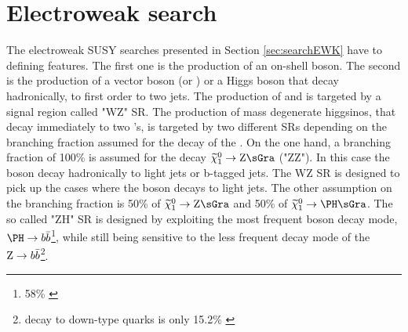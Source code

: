 \section{Electroweak search}
The electroweak SUSY searches presented in Section \ref{sec:searchEWK} have to defining features. The first one is the production of an on-shell \PZ boson. 
The second is the production of a vector boson (\PW or \PZ) or a Higgs boson that decay hadronically, to first order to two jets. 
The production of \firstcharg and \PSGczDt is targeted by a signal region called "WZ" SR. 
The production of mass degenerate higgsinos, that decay immediately to two \PSGczDo's, is targeted by two different SRs depending on the branching fraction assumed for the decay of the \PSGczDo. 
On the one hand, a branching fraction of 100\% is assumed for the decay $\PSGczDo\rightarrow\PZ\gravitino$ ("ZZ"). 
In this case the \PZ boson decay hadronically to light jets or b-tagged jets. The WZ SR is designed to pick up the cases where the \PZ boson decays to light jets. 
The other assumption on the branching fraction is 50\% of $\PSGczDo\rightarrow\PZ\gravitino$ and 50\% of $\PSGczDo\rightarrow\PH\gravitino$. 
The so called "ZH" SR is designed by exploiting the most frequent \PH boson decay mode, $\PH\rightarrow b\bar{b}$\footnote{58\% \cite{deFlorian:2016spz}}, while still being sensitive to the less frequent decay mode of the $\mathrm{Z}\rightarrow b\bar{b}$\footnote{\PZ decay to down-type quarks is only 15.2\% \cite{PhysRevD.98.030001}}.   
